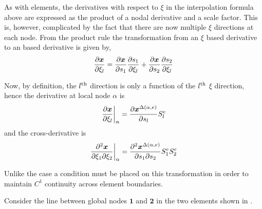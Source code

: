 As with \onedal \cubicherm elements, the derivatives with respect to $\xi$ in
the \twodal interpolation formula above are expressed as the product of a
nodal \arclen derivative and a scale factor. This is, however, complicated by
the fact that there are now multiple $\xi$ directions at each node. From the
product rule the transformation from an $\xi$ based derivative to an \arclen
based derivative is given by,
\begin{equation}
  \delby{\vect{x}}{\xi_{l}}=\delby{\vect{x}}{s_{1}}\delby{s_{1}}{\xi_{l}}+
  \delby{\vect{x}}{s_{2}}\delby{s_{2}}{\xi_{l}}
  \label{eqn:xitosproductrule}
\end{equation}

Now, by definition, the ${l}^{\text{th}}$ \arclen direction is only a function of the
${l}^{\text{th}}$ $\xi$ direction, hence the derivative at local node $\alpha$ is
\begin{equation}
  \evalat{\delby{\vect{x}}{\xi_{l}}}{\alpha}=\delby{\nodept{\vect{x}}{
      \fnof{\Delta}{\alpha,e}}}{s_{l}}\esftwo{e}{l}
  \label{eqn:xitosbich}
\end{equation}
and the cross-derivative is
\begin{equation}
  \evalat{\deltwoby{\vect{x}}{\xione}{\xitwo}}{\alpha}=
  \deltwoby{\nodept{\vect{x}}{\fnof{\Delta}{\alpha,e}}}{s_{1}}{s_{2}}\esftwo{e}{1}
  \esftwo{e}{2}
  \label{eqn:xitosbichcd}
\end{equation}

Unlike the \onedal \cubicherm case a condition must be placed on
this transformation in order to maintain $C^{1}$ continuity across element
boundaries. 

Consider the line between global nodes $\mathbf{1}$ and $\mathbf{2}$ in the
two \bicubicherm elements shown in .

